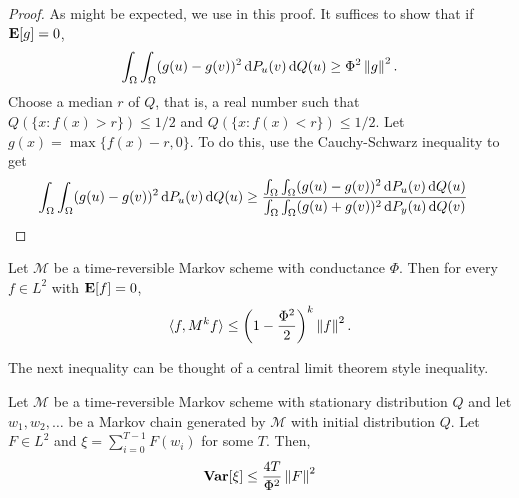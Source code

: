 \begin{proof}
As might be expected, we use  in this proof. It suffices to show that if $\textbf{E}[g]=0$,
\[ \int_\Omega \int_\Omega (g(u)-g(v))^2 \operatorname{d}\!{P}_u(v)\operatorname{d}\!{Q}(u) \geq \Phi^2 \left\lVert g\right\rVert^2. \]
Choose a median $r$ of $Q$, that is, a real number such that $Q(\{x:f(x)>r\}) \leq 1/2$ and $Q(\{x:f(x)<r\}) \leq 1/2$. Let $g(x)=\max\{f(x)-r,0\}$.
To do this, use the Cauchy-Schwarz inequality to get
\begin{align*}
    \int_\Omega \int_\Omega (g(u)-g(v))^2 \operatorname{d}\!{P}_u(v)\operatorname{d}\!{Q}(u) &\geq \frac{\int_\Omega \int_\Omega (g(u)-g(v))^2 \operatorname{d}\!{P}_u(v)\operatorname{d}\!{Q}(u)}{\int_\Omega \int_\Omega (g(u)+g(v))^2 \operatorname{d}\!{P}_y(u)\operatorname{d}\!{Q}(v)}  
\end{align*}
\end{proof}

\begin{corollary}
Let $\mathcal{M}$ be a time-reversible Markov scheme with conductance $\Phi$. Then for every $f\in L^2$ with $\textbf{E}[f]=0$,
\[ \langle f,M^k f\rangle \leq \left(1-\frac{\Phi^2}{2}\right)^k\left\lVert f\right\rVert^2. \]
\end{corollary}

The next inequality can be thought of a central limit theorem style inequality.

\begin{theorem}
Let $\mathcal{M}$ be a time-reversible Markov scheme with stationary distribution $Q$ and let $w_1,w_2,\ldots$ be a Markov chain generated by $\mathcal{M}$ with initial distribution $Q$. Let $F\in L^2$ and $\xi = \sum_{i=0}^{T-1}F(w_i)$ for some $T$. Then,
\[ \operatorname{\textbf{Var}}[\xi] \leq \frac{4T}{\Phi^2}\left\lVert F\right\rVert^2 \]
\end{theorem}